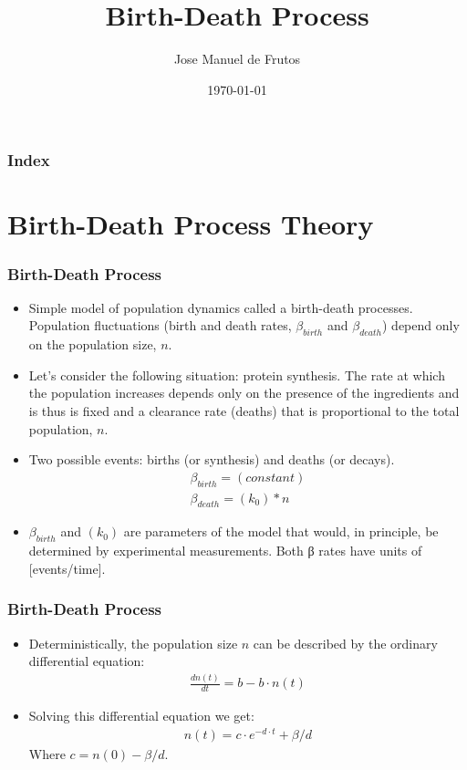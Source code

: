 \documentclass[10pt, usenames, dvipsnames, xcolor=table]{beamer}
\title[]{Birth-Death Process}
\author[Jose Manuel de Frutos]{\sc  Jose Manuel de Frutos}
\institute[]{\textbf {}}
\date{\today}
\begin{document}
\frame{\titlepage}

\begin{frame}
  \frametitle{Index}
  \tableofcontents
\end{frame}

\section{Birth-Death Process Theory}
\begin{frame}
\frametitle{Birth-Death Process}

\begin{itemize}
\item Simple model of population dynamics called a birth-death processes. Population fluctuations (birth and death rates, $\beta_{birth}$ and $\beta_{death}$) depend only on the population size, $n$.

\item Let’s consider the following situation: protein synthesis. The rate at which the population increases depends only on the presence of the ingredients and is thus is fixed and a clearance rate (deaths) that is proportional to the total population, $n$.


\item Two possible events: births (or synthesis) and deaths (or decays).
\begin{align*}
\beta_{birth} = (constant)\\
\beta_{death}  = (k_0)*n
\end{align*}
\item $\beta_{birth}$  and $(k_0)$ are parameters of the model that would, in principle, be determined by experimental measurements. Both β rates have units of [events/time].
\end{itemize}
\end{frame}

\begin{frame}
\frametitle{Birth-Death Process}

\begin{itemize}
\item Deterministically, the population size $n$ can be described by the ordinary differential equation:
\begin{align*}
\frac{dn(t)}{dt} = b - b \cdot n(t)
\end{align*}
\item Solving this differential equation we get:
\begin{align*}
n(t) = c \cdot e^{-d\cdot t}+\beta/d
\end{align*}
Where $c=n(0)-\beta/d$.
\end{itemize}
\end{frame}
\end{document}
